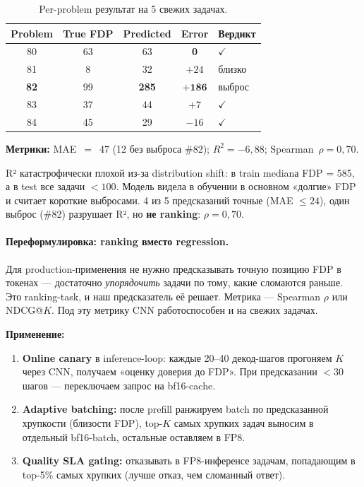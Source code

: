 \documentclass[a4paper,12pt]{article}
\begin{document}
\begin{table}[H]
\centering
\caption{Per-problem результат на 5 свежих задачах.}
\label{tab:fresh5}
\begin{tabular}{ccccl}
\toprule
Problem & True FDP & Predicted & Error & Вердикт \\
\midrule
80 & 63 & 63 & \textbf{0} & $\checkmark$ \\
81 & 8 & 32 & $+24$ & близко \\
\textbf{82} & 99 & \textbf{285} & $\mathbf{+186}$ & выброс \\
83 & 37 & 44 & $+7$ & $\checkmark$ \\
84 & 45 & 29 & $-16$ & $\checkmark$ \\
\bottomrule
\end{tabular}
\end{table}

\textbf{Метрики:} MAE~$=$~47 (12 без выброса \#82); $R^2 = -6{,}88$;
Spearman~$\rho = 0{,}70$.

R² катастрофически плохой из-за distribution shift: в train medianа
FDP = 585, а в test все задачи $< 100$. Модель видела в обучении в
основном «долгие» FDP и считает короткие выбросами. 4 из 5 предсказаний
точные (MAE $\le 24$), один выброс (\#82) разрушает R², но \textbf{не
ranking}: $\rho = 0{,}70$.

\paragraph{Переформулировка: ranking вместо regression.} Для
production-применения не нужно предсказывать точную позицию FDP в
токенах --- достаточно \textit{упорядочить} задачи по тому, какие
сломаются раньше. Это ranking-task, и наш предсказатель её решает.
Метрика --- Spearman $\rho$ или NDCG@$K$. Под эту метрику CNN
работоспособен и на свежих задачах.

\textbf{Применение:}
\begin{enumerate}[label=\arabic*.,leftmargin=*]
\item \textbf{Online canary} в inference-loop: каждые 20--40 декод-шагов
  прогоняем $K$ через CNN, получаем «оценку доверия до FDP». При
  предсказании $< 30$ шагов --- переключаем запрос на bf16-cache.
\item \textbf{Adaptive batching:} после prefill ранжируем batch по
  предсказанной хрупкости (близости FDP), top-$K$ самых хрупких задач
  выносим в отдельный bf16-batch, остальные оставляем в FP8.
\item \textbf{Quality SLA gating:} отказывать в FP8-инференсе задачам,
  попадающим в top-5\% самых хрупких (лучше отказ, чем сломанный
  ответ).
\end{enumerate}
\end{document}
